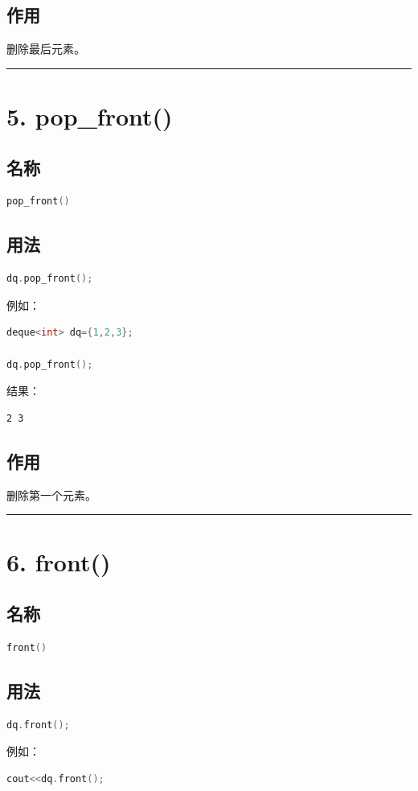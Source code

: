 \documentclass[10pt,twocolumn]{extarticle}
\begin{document}
\subsection{作用}
删除最后元素。

\noindent\rule{\linewidth}{0.4pt}

\section{5. pop\_front()}

\subsection{名称}
\begin{lstlisting}[language=C++]
pop_front()
\end{lstlisting}

\subsection{用法}
\begin{lstlisting}[language=C++]
dq.pop_front();
\end{lstlisting}
例如：
\begin{lstlisting}[language=C++]
deque<int> dq={1,2,3};

dq.pop_front();
\end{lstlisting}
结果：
\begin{lstlisting}
2 3
\end{lstlisting}

\subsection{作用}
删除第一个元素。

\noindent\rule{\linewidth}{0.4pt}

\section{6. front()}

\subsection{名称}
\begin{lstlisting}[language=C++]
front()
\end{lstlisting}

\subsection{用法}
\begin{lstlisting}[language=C++]
dq.front();
\end{lstlisting}
例如：
\begin{lstlisting}[language=C++]
cout<<dq.front();
\end{lstlisting}
\end{document}

